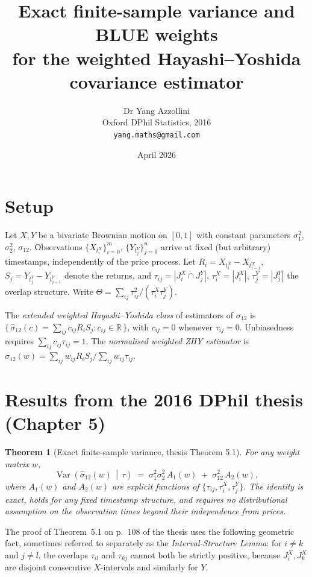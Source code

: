 \documentclass[11pt]{article}
\title{\vspace{-1.5em}Exact finite-sample variance and BLUE weights\\
for the weighted Hayashi--Yoshida covariance estimator}
\author{Dr Yang Azzollini \\
\small Oxford DPhil Statistics, 2016 \\
\small \texttt{yang.maths@gmail.com}}
\date{April 2026}
\newtheorem{theorem}{Theorem}
\begin{document}
\maketitle
\vspace{-2em}

\section*{Setup}

Let $X, Y$ be a bivariate Brownian motion on $[0, 1]$ with constant
parameters $\sigma_1^2$, $\sigma_2^2$, $\sigma_{12}$. Observations
$\{X_{t_i^X}\}_{i=0}^m$, $\{Y_{t_j^Y}\}_{j=0}^n$ arrive at fixed
(but arbitrary) timestamps, independently of the price process.
Let $R_i = X_{t_i^X} - X_{t_{i-1}^X}$, $S_j = Y_{t_j^Y} - Y_{t_{j-1}^Y}$
denote the returns, and $\tau_{ij} = |J_i^X \cap J_j^Y|$,
$\tau_i^X = |J_i^X|$, $\tau_j^Y = |J_j^Y|$ the overlap structure.
Write $\Theta = \sum_{ij} \tau_{ij}^2 / (\tau_i^X \tau_j^Y)$.

The \emph{extended weighted Hayashi--Yoshida class} of estimators of
$\sigma_{12}$ is $\big\{\,\hat\sigma_{12}(c) = \sum_{ij} c_{ij} R_i S_j
: c_{ij} \in \mathbb{R}\,\big\}$, with $c_{ij} = 0$ whenever
$\tau_{ij} = 0$. Unbiasedness requires $\sum_{ij} c_{ij} \tau_{ij} = 1$.
The \emph{normalised weighted ZHY estimator} is
$\hat\sigma_{12}(w) = \sum_{ij} w_{ij} R_i S_j / \sum_{ij} w_{ij} \tau_{ij}$.

\section*{Results from the 2016 DPhil thesis (Chapter 5)}

\begin{theorem}[Exact finite-sample variance, thesis Theorem 5.1]
For any weight matrix $w$,
\[
\operatorname{Var}\!\left(\hat\sigma_{12}(w) \,\middle|\, \tau\right)
\;=\; \sigma_1^2 \sigma_2^2 \, A_1(w) \;+\; \sigma_{12}^2 \, A_2(w),
\]
where $A_1(w)$ and $A_2(w)$ are explicit functions of
$\{\tau_{ij}, \tau_i^X, \tau_j^Y\}$. The identity is exact, holds
for any fixed timestamp structure, and requires no distributional
assumption on the observation times beyond their independence from
prices.
\end{theorem}

The proof of Theorem~5.1 on p.~108 of the thesis uses the following
geometric fact, sometimes referred to separately as the
\emph{Interval-Structure Lemma}: for $i \ne k$ and $j \ne l$, the
overlaps $\tau_{il}$ and $\tau_{kj}$ cannot both be strictly
positive, because $J_i^X, J_k^X$ are disjoint consecutive
$X$-intervals and similarly for $Y$.
\end{document}
